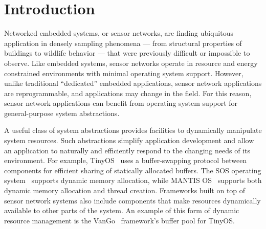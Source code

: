 \section{Introduction}
\label{sec:intro}

% 
% 
% 
% 


Networked embedded systems, or sensor networks, are finding ubiquitous
application in densely sampling phenomena --- from structural properties of
buildings to wildlife behavior --- that were previously difficult or
impossible to observe.  
%
Like embedded systems, sensor networks operate in resource and energy
constrained environments with minimal operating system support.  
%
However, unlike traditional ``dedicated'' embedded applications, sensor
network applications are reprogrammable, and applications may change in the
field.  
%
For this reason, sensor network applications can benefit from operating
system support for general-purpose system abstractions.



A useful class of system abstractions provides facilities to dynamically
manipulate system resources.  
%
Such abstractions simplify application development and allow an application
to naturally and efficiently respond to the changing needs of its
environment.  
%
For example, TinyOS~\cite{TinyOS} uses a buffer-swapping protocol between
components for efficient sharing of statically allocated buffers.  
%
The SOS operating system~\cite{sos} supports dynamic memory allocation,
while MANTIS OS~\cite{abrach03mantis} supports both dynamic memory
allocation and thread creation.  
%
Frameworks built on top of sensor network systems also include components
that make resources dynamically available to other parts of the system.  
%
An example of this form of dynamic resource management is the
VanGo~\cite{greenstein05vango} framework's buffer pool for TinyOS. 




